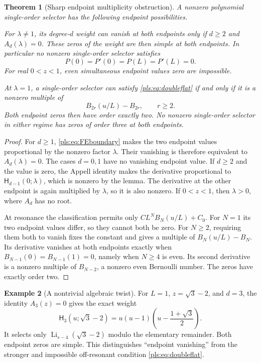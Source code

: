 \documentclass[11pt,letterpaper]{article}
\numberwithin{equation}{section}
\newtheorem{theorem}{Theorem}[section]
\theoremstyle{definition}
\newtheorem{example}[theorem]{Example}
\theoremstyle{remark}\newtheorem{remark}[theorem]{Remark}
\newcommand{\Li}{\operatorname{Li}}
\newcommand{\HFE}{\mathsf H}
\begin{document}
\begin{theorem}[Sharp endpoint multiplicity obstruction]
\label{pls:thm:flatness}
A nonzero polynomial single-order selector has the following endpoint
possibilities.

For $\lambda\ne1$, its degree-$d$ weight can vanish at both endpoints
only if $d\ge2$ and $A_d(\lambda)=0$. These zeros of the weight are
then simple at both endpoints. In particular no nonzero single-order
selector satisfies
\begin{equation}\label{pls:eq:doubleflat}
 P(0)=P'(0)=P(L)=P'(L)=0.
\end{equation}
For real $0<z<1$, even simultaneous endpoint values zero are impossible.

At $\lambda=1$, a single-order selector can satisfy
\eqref{pls:eq:doubleflat} if and only if it is a nonzero multiple of
\begin{equation}\label{pls:eq:Bernflat}
 B_{2r}(u/L)-B_{2r},\qquad r\ge2.
\end{equation}
Both endpoint zeros then have order exactly two. No nonzero
single-order selector in either regime has zeros of order three at
both endpoints.
\end{theorem}
\begin{proof}
For $d\ge1$, \eqref{pls:eq:FEboundary} makes the two endpoint values
proportional by the nonzero factor $\lambda$. Their vanishing is
therefore equivalent to $A_d(\lambda)=0$. The cases $d=0,1$ have
no vanishing endpoint value. If $d\ge2$ and the value is zero, the
Appell identity makes the derivative proportional to
$\HFE_{d-1}(0;\lambda)$, which is nonzero by the lemma.
The derivative at the other endpoint is again multiplied by
$\lambda$, so it is also nonzero. If $0<z<1$, then $\lambda>0$,
where $A_d$ has no root.

At resonance the classification permits only
$C L^N B_N(u/L)+C_0$. For $N=1$ its two endpoint values differ,
so they cannot both be zero. For $N\ge2$, requiring them both to
vanish fixes the constant and gives a multiple of
$B_N(u/L)-B_N$. Its derivative vanishes at both endpoints exactly
when $B_{N-1}(0)=B_{N-1}(1)=0$, namely when $N\ge4$ is even.
Its second derivative is a nonzero multiple of $B_{N-2}$, a nonzero
even Bernoulli number. The zeros have exactly order two.
\end{proof}

\begin{example}[A nontrivial algebraic twist]\label{pls:ex:algebraic}
For $L=1$, $z=\sqrt3-2$, and $d=3$, the identity
$A_3(z)=0$ gives the exact weight
\begin{equation}\label{pls:eq:algebraicP}
 \HFE_3(u;\sqrt3-2)
 =u(u-1)\left(u-\frac{1+\sqrt3}{2}\right).
\end{equation}
It selects only $\Li_{s-4}(\sqrt3-2)$ modulo the elementary
remainder. Both endpoint zeros are simple. This distinguishes
``endpoint vanishing'' from the stronger and impossible off-resonant
condition \eqref{pls:eq:doubleflat}.
\end{example}
\end{document}
